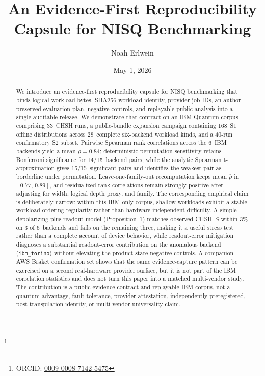 \documentclass[aps,prxquantum,twocolumn,superscriptaddress,amsmath,amssymb,longbibliography,floatfix]{revtex4-2}
\begin{document}
\title{An Evidence-First Reproducibility Capsule for NISQ Benchmarking}

\author{Noah Erlwein}
\thanks{ORCID: \href{https://orcid.org/0009-0008-7142-5475}{0009-0008-7142-5475}}

\date{May 1, 2026}

\begin{abstract}
We introduce an evidence-first reproducibility capsule for NISQ benchmarking that binds logical workload bytes, SHA256 workload identity, provider job IDs, an author-preserved evaluation plan, negative controls, and replayable public analysis into a single auditable release. We demonstrate that contract on an IBM Quantum corpus comprising 33~CHSH runs, a public-bundle expansion campaign containing 168~S1 offline distributions across 28~complete six-backend workload kinds, and a 40-run confirmatory S2 subset. Pairwise Spearman rank correlations across the 6~IBM backends yield a mean $\bar{\rho} = 0.84$; deterministic permutation sensitivity retains Bonferroni significance for 14/15~backend pairs, while the analytic Spearman t-approximation gives 15/15~significant pairs and identifies the weakest pair as borderline under permutation. Leave-one-family-out recomputation keeps mean $\bar{\rho}$ in $[0.77,\,0.89]$, and residualized rank correlations remain strongly positive after adjusting for width, logical depth proxy, and family. The corresponding empirical claim is deliberately narrow: within this IBM-only corpus, shallow workloads exhibit a stable workload-ordering regularity rather than hardware-independent difficulty. A simple depolarizing-plus-readout model (Proposition~1) matches observed CHSH~$S$ within 3\% on 3 of 6~backends and fails on the remaining three, making it a useful stress test rather than a complete account of device behavior, while readout-error mitigation diagnoses a substantial readout-error contribution on the anomalous backend (\texttt{ibm\_torino}) without elevating the product-state negative controls. A companion AWS Braket confirmation set shows that the same evidence-capture pattern can be exercised on a second real-hardware provider surface, but it is not part of the IBM correlation statistics and does not turn this paper into a matched multi-vendor study. The contribution is a public evidence contract and replayable IBM corpus, not a quantum-advantage, fault-tolerance, provider-attestation, independently preregistered, post-transpilation-identity, or multi-vendor universality claim.
\end{abstract}
\end{document}
